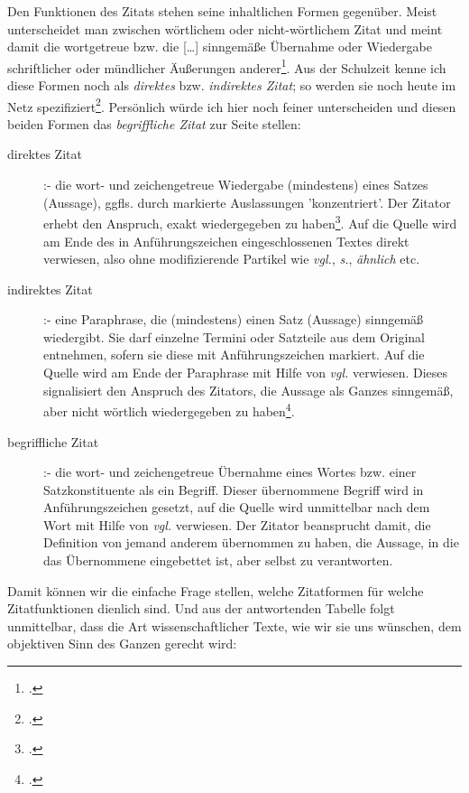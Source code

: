 Den Funktionen des Zitats stehen seine inhaltlichen Formen gegenüber. Meist
unterscheidet man zwischen \glqq{}wörtlichem\grqq{} oder
\glqq{}nicht-wörtlichem\grqq{} Zitat und meint damit die wortgetreue bzw. die
\glqq{}[\ldots] sinngemäße Übernahme oder Wiedergabe schriftlicher oder
mündlicher Äußerungen anderer\grqq{}\footcite[vgl.][187f - ohne Frage, dieses
ist ein sinngemäßes und kein wörtliches Zitat. Und es ist
affirmativ]{RueStaFra1980a}. Aus der Schulzeit kenne ich diese Formen noch als
\emph{direktes} bzw. \emph{indirektes Zitat}; so werden sie noch heute im Netz
spezifiziert\footcite[vgl.][\nopage]{WisArbOrgZitate}. Persönlich würde ich hier
noch feiner unterscheiden und diesen beiden Formen das \emph{begriffliche Zitat}
zur Seite stellen:
\begin{description}
  \item[direktes Zitat] :- die wort- und zeichengetreue Wiedergabe (mindestens)
  eines Satzes (Aussage), ggfls. durch markierte Auslassungen 'konzentriert'.
  Der Zitator erhebt den Anspruch, exakt wiedergegeben zu
  haben\footcite[vgl.][187f]{RueStaFra1980a}. Auf die Quelle wird am Ende des in
  Anführungszeichen eingeschlossenen Textes direkt verwiesen, also ohne
  modifizierende Partikel wie {\itshape vgl.}, {\itshape s.}, {\itshape ähnlich}
  etc.
  \item[indirektes Zitat] :- eine Paraphrase, die (mindestens) einen Satz
  (Aussage) sinngemäß wiedergibt. Sie darf einzelne Termini oder Satzteile aus
  dem Original entnehmen, sofern sie diese mit Anführungszeichen markiert. Auf
  die Quelle wird am Ende der Paraphrase mit Hilfe von {\itshape vgl.}
  verwiesen. Dieses signalisiert den Anspruch des Zitators, die Aussage als
  Ganzes sinngemäß, aber nicht wörtlich wiedergegeben zu
  haben\footcite[vgl.][\nopage letzter Absatz aus Abschnitt 'Grenzen der
  Zitierpflicht']{Wikipedia2011a}. \item[begriffliche Zitat] :- die wort- und
  zeichengetreue Übernahme eines Wortes bzw. einer Satzkonstituente als ein
  Begriff. Dieser übernommene Begriff wird in Anführungszeichen gesetzt, auf die
  Quelle wird unmittelbar nach dem Wort mit Hilfe von {\itshape vgl.} verwiesen.
  Der Zitator beansprucht damit, die Definition von jemand anderem übernommen zu
  haben, die Aussage, in die das Übernommene eingebettet ist, aber selbst zu
  verantworten.
\end{description}

Damit können wir die einfache Frage stellen, welche Zitatformen für welche
Zitatfunktionen dienlich sind. Und aus der antwortenden Tabelle folgt
unmittelbar, dass die Art wissenschaftlicher Texte, wie wir sie uns wünschen,
dem objektiven Sinn des Ganzen gerecht wird:

